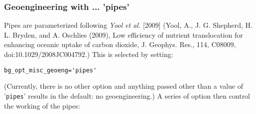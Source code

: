 \subsubsection{Geoengineering with ... 'pipes'}
\vspace{1mm}

Pipes are parameterized following \textit{Yool et al.} [2009] (Yool, A., J. G. Shepherd, H. L. Bryden, and A. Oschlies (2009), Low efficiency of nutrient translocation for enhancing
oceanic uptake of carbon dioxide, J. Geophys. Res., 114, C08009, doi:10.1029/2008JC004792.) This is selected by setting:
\vspace{-1mm}\begin{verbatim}
bg_opt_misc_geoeng='pipes'
\end{verbatim}\vspace{-1mm}
(Currently, there is no other option and anything passed other than a value of '\texttt{pipes}' results in the default: no geoengineering.)
A series of option then control the working of the pipes:

